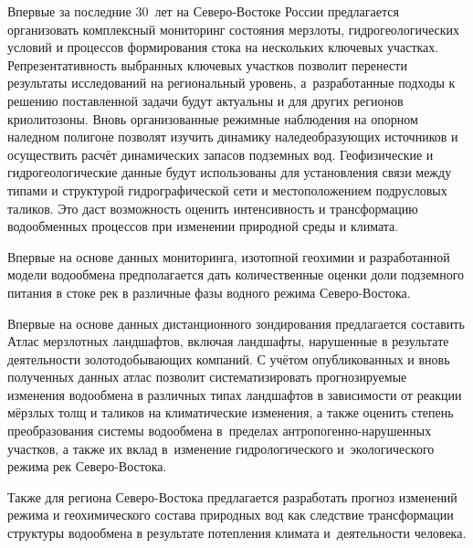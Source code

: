 Впервые за последние 30~лет на Северо-Востоке России предлагается организовать комплексный мониторинг состояния мерзлоты, гидрогеологических условий и процессов формирования стока на нескольких ключевых участках. Репрезентативность выбранных ключевых участков позволит перенести результаты исследований на региональный уровень, а~разработанные подходы к решению поставленной задачи будут актуальны и для других регионов криолитозоны.
\clearpage
Вновь организованные режимные наблюдения на опорном наледном полигоне позволят изучить динамику наледеобразующих источников и осуществить расчёт динамических запасов подземных вод. Геофизические и гидрогеологические данные будут использованы для установления связи между типами и структурой гидрографической сети и местоположением подрусловых таликов. Это даст возможность оценить интенсивность и трансформацию водообменных процессов при изменении природной среды и климата.

Впервые на основе данных мониторинга, изотопной геохимии и разработанной модели водообмена предполагается дать количественные оценки доли подземного питания в стоке рек в различные фазы водного режима Северо-Востока.

Впервые на основе данных дистанционного зондирования предлагается составить Атлас мерзлотных ландшафтов, включая ландшафты, нарушенные в результате деятельности золотодобывающих компаний. С учётом опубликованных и вновь полученных данных атлас позволит систематизировать прогнозируемые изменения водообмена в различных типах ландшафтов в зависимости от реакции мёрзлых толщ и таликов на климатические изменения, а также оценить степень преобразования системы водообмена в~пределах антропогенно-нарушенных участков, а также их вклад в~изменение гидрологического и~экологического режима рек Северо-Востока.

Также для региона Северо-Востока предлагается разработать прогноз изменений режима и геохимического состава природных вод как следствие трансформации структуры водообмена в результате потепления климата и~деятельности человека.

